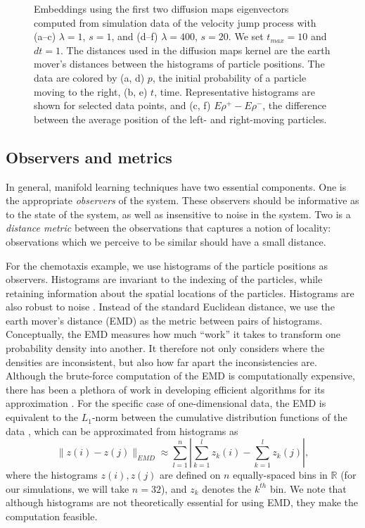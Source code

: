 \documentclass[3p]{elsarticle}
\begin{document}
\begin{figure}[t!]
\begin{subfigure}{\figwidth}
\caption{}
\label{subfig:large_lambda_rho}
\end{subfigure}
\caption{Embeddings using the first two diffusion maps eigenvectors computed from simulation data of the velocity jump process with (a--c) $\lambda=1$, $s=1$, and (d--f) $\lambda=400$, $s=20$.  We set $t_{max} = 10$ and $dt=1$. The distances used in the diffusion maps kernel are the earth mover's distances between the histograms of particle positions. The data are colored by (a, d) $p$, the initial probability of a particle moving to the right, (b, e) $t$, time. Representative histograms are shown for selected data points, and (c, f) $E \rho^+ - E \rho^-$, the difference between the average position of the left- and right-moving particles.}
\label{fig:dmaps_embed_emd}
\end{figure}

\subsection{Observers and metrics}

In general, manifold learning techniques have two essential components.
%
One is the appropriate {\em observers} of the system. 
%
These observers should be informative as to the state of the system, as well as insensitive to noise in the system. 
%
Two is a {\em distance metric} between the observations that captures a notion of locality: observations which we perceive to be similar should have a small distance. 

For the chemotaxis example, we use histograms of the particle positions as observers. 
%
Histograms are invariant to the indexing of the particles, while retaining information about the spatial locations of the particles.
%
Histograms are also robust to noise \cite{talmon2013empirical}. 
%
Instead of the standard Euclidean distance, we use the earth mover's distance (EMD) \cite{rubner2000earth} as the metric between pairs of histograms. 
%
Conceptually, the EMD measures how much ``work'' it takes to transform one probability density into another.
%
It therefore not only considers where the densities are inconsistent, but also how far apart the inconsistencies are.
%
Although the brute-force computation of the EMD is computationally expensive, there has been a plethora of work in developing efficient algorithms for its approximation \cite{Pele-eccv2008, Pele-iccv2009}.
%
For the specific case of one-dimensional data, the EMD is equivalent to the $L_1$-norm between the cumulative distribution functions of the data \cite{rubner2000perceptual}, which can be approximated from histograms as
\begin{equation}
\| z(i) - z(j) \|_{EMD} \approx \sum_{l=1}^{n} \left| \sum_{k=1}^l z_k(i) - \sum_{k=1}^l z_k(j) \right|,
\end{equation}
where the histograms $z(i), z(j)$ are defined on $n$ equally-spaced bins in $\mathbb{R}$ (for our simulations, we will take $n=32$), and $z_k$ denotes the $k^{th}$ bin. 
%
We note that although histograms are not theoretically essential for using EMD, they make the computation feasible. 
\end{document}
